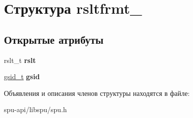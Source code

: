 \hypertarget{structrsltfrmt__0}{}\section{Структура rsltfrmt\+\_}
\label{structrsltfrmt__0}
\subsection*{Открытые атрибуты}
\begin{DoxyCompactItemize}
\item 
\mbox{\label{structrsltfrmt__0_a717795d80df20b871c3db8998ab5c7a2}} 
rslt\+\_\+t {\bfseries rslt}
\item 
\mbox{\label{structrsltfrmt__0_a6baad4340cc4fdf53078aa898cbe6441}} 
\hyperlink{structgsid__container}{gsid\+\_\+t} {\bfseries gsid}
\end{DoxyCompactItemize}


Объявления и описания членов структуры находятся в файле\+:\begin{DoxyCompactItemize}
\item 
spu-\/api/libspu/spu.\+h\end{DoxyCompactItemize}
